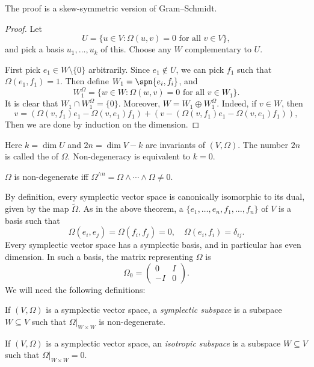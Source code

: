 \documentclass[a4paper]{article}
\begin{document}
The proof is a skew-symmetric version of Gram--Schmidt.
\begin{proof}
  Let
  \[
    U = \{u \in V : \Omega(u, v) = 0\text{ for all }v \in V\},
  \]
  and pick a basis $u_1, \ldots, u_k$ of this. Choose any $W$ complementary to $U$.

  First pick $e_1 \in W \setminus \{0\}$ arbitrarily. Since $e_1 \not \in U$, we can pick $f_1$ such that $\Omega(e_1, f_1) = 1$. Then define $W_1 = \spn\{e_i, f_i\}$, and
  \[
    W_1^\Omega = \{w \in W: \Omega(w, v) = 0\text{ for all }v \in W_1\}.
  \]
  It is clear that $W_1 \cap W_1^\Omega = \{0\}$. Moreover, $W = W_1 \oplus W_1^\Omega$. Indeed, if $v \in W$, then
  \[
    v = (\Omega(v, f_1) e_1 - \Omega(v, e_1) f_1) + (v - (\Omega(v, f_1) e_1 - \Omega(v, e_1) f_1)),
  \]
  Then we are done by induction on the dimension.
\end{proof}
Here $k = \dim U$ and $2n = \dim V - k$ are invariants of $(V, \Omega)$. The number $2n$ is called the  of $\Omega$. Non-degeneracy is equivalent to $k = 0$.

\begin{ex}
  $\Omega$ is non-degenerate iff $\Omega^{\wedge n} = \Omega \wedge \cdots \wedge \Omega \not= 0$.
\end{ex}

By definition, every symplectic vector space is canonically isomorphic to its dual, given by the map $\tilde{\Omega}$. As in the above theorem, a  $\{e_1, \ldots, e_n, f_1, \ldots, f_n\}$ of $V$ is a basis such that
\[
  \Omega(e_i, e_j) = \Omega(f_i, f_j) = 0,\quad \Omega(e_i, f_i) = \delta_{ij}.
\]
Every symplectic vector space has a symplectic basis, and in particular has even dimension. In such a basis, the matrix representing $\Omega$ is
\[
  \Omega_0 = \begin{pmatrix}
    0 & I\\
    -I & 0
  \end{pmatrix}.
\]
We will need the following definitions:
\begin{defi}
  If $(V, \Omega)$ is a symplectic vector space, a \emph{symplectic subspace} is a subspace $W \subseteq V$ such that $\Omega|_{W \times W}$ is non-degenerate.
\end{defi}

\begin{defi}
  If $(V, \Omega)$ is a symplectic vector space, an \emph{isotropic subspace} is a subspace $W \subseteq V$ such that $\Omega|_{W \times W} = 0$.
\end{defi}
\end{document}
